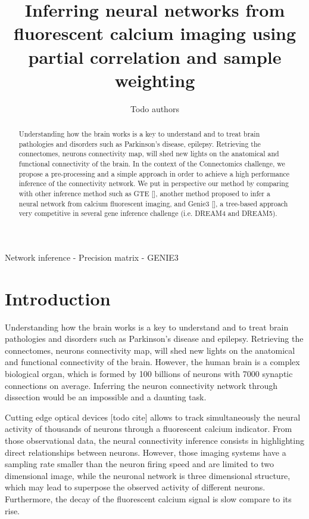 \documentclass[wcp]{jmlr}
\title[Connectomics challenge]{Inferring neural networks from fluorescent
                               calcium imaging using partial correlation and
                               sample weighting}
\author{Todo authors}
\begin{document}
\maketitle


\begin{abstract}
Understanding how the brain works is a key to understand and to treat
brain pathologies and disorders such as Parkinson's disease, epilepsy.
Retrieving the connectomes, neurons connectivity map, will shed new lights on
the anatomical and functional connectivity of the brain.
In the context of the Connectomics challenge, we propose a pre-processing and a simple approach in order to achieve a high performance inference of the connectivity network.
We put in perspective our method by comparing with other inference method such as GTE [], another method proposed to infer a neural network from calcium fluorescent imaging, and Genie3 [], a tree-based approach very competitive in several gene inference challenge (i.e. DREAM4 and DREAM5).\\


\end{abstract}

\begin{keywords}
Network inference - Precision matrix - GENIE3
\end{keywords}


\section{Introduction}\label{sec:intro}

Understanding how the brain works is a key to understand and to treat
brain pathologies and disorders such as Parkinson's disease and epilepsy.
Retrieving the connectomes, neurons connectivity map, will shed new lights on
the anatomical and functional connectivity of the brain. However,
the human brain is a complex biological organ, which is formed by 100
billions of neurons with 7000 synaptic connections on average. Inferring the
neuron connectivity network through dissection would be an impossible
and a daunting task.

Cutting edge optical devices [todo cite] allows to track simultaneously
the neural activity of thousands of neurons through a fluorescent
calcium indicator.
From those observational data, the neural connectivity inference consists in
highlighting direct relationships between neurons. However, those imaging
systems have a sampling rate smaller than the neuron firing speed and are
limited to two dimensional image, while the neuronal network is three dimensional
structure, which may lead to superpose the observed activity
of different neurons. Furthermore, the decay of the fluorescent calcium signal
is slow compare to its rise.
\end{document}
